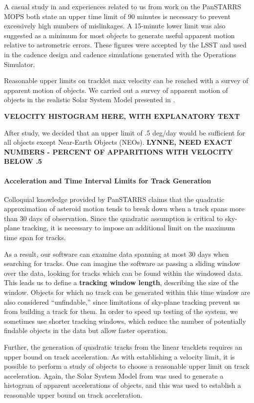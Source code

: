 \documentclass[12pt,preprint]{aastex}
\begin{document}
A casual study in \citet{kubica_thesis} and experiences related to us
from work on the PanSTARRS MOPS both state an upper time limit of 90
minutes is necessary to prevent excessively high numbers of
mislinkages. A 15-minute lower limit was also suggested as a minimum
for most objects to generate useful apparent motion relative to
astrometric errors. These figures were accepted by the LSST and used
in the cadence design and cadence simulations generated with the
Operations Simulator.  

Reasonable upper limits on tracklet max velocity can be reached with a
survey of apparent motion of objects.  We carried out a survey of
apparent motion of objects in the realistic Solar System Model
presented in \citet{Grav2011}.

\textbf{VELOCITY HISTOGRAM HERE, WITH EXPLANATORY TEXT}

After study, we decided that an upper limit of .5 deg/day would be
sufficient for all objects except Near-Earth Objects
(NEOs). \textbf{LYNNE, NEED EXACT NUMBERS - PERCENT OF APPARITIONS
  WITH VELOCITY BELOW .5}




\paragraph{Acceleration and Time Interval Limits for Track Generation}

Colloquial knowledge provided by PanSTARRS claims that the quadratic
approximation of asteroid motion tends to break down when a track
spans more than 30 days of observation.  Since the quadratic
assumption is critical to sky-plane tracking, it is necessary to
impose an additional limit on the maximum time span for tracks. 

As a result, our software can examine data spanning at most 30 days
when searching for tracks.  One can imagine the software as passing a
sliding window over the data, looking for tracks which can be found
within the windowed data.  This leads us to define a \textbf{tracking
  window length}, describing the size of the window.  Objects for
which no track can be generated within this time window are also
considered ``unfindable,'' since limitations of sky-plane tracking
prevent us from building a track for them.  In order to speed up
testing of the system, we sometimes use shorter tracking windows,
which reduce the number of potentially findable objects in the data
but allow faster operation.

Further, the generation of quadratic tracks from the linear tracklets requires
an upper bound on track acceleration.  As with establishing a velocity
limit, it is possible to perform a study of objects to choose a
reasonable upper limit on track acceleration.  Again, the Solar System
Model from \citet{Grav2011} was used to generate a histogram of
apparent accelerations of objects, and this was used to establish a
reasonable upper bound on track acceleration.
\end{document}
